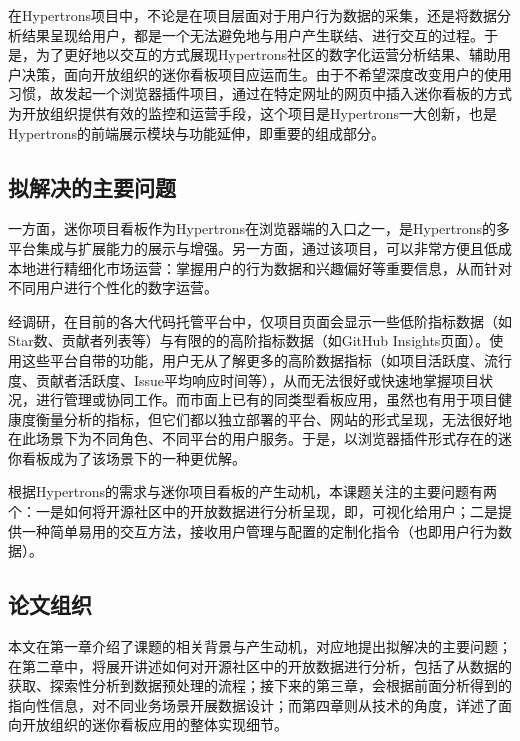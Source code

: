 \par 在Hypertrons项目中，不论是在项目层面对于用户行为数据的采集，还是将数据分析结果呈现给用户，都是一个无法避免地与用户产生联结、进行交互的过程。于是，为了更好地以交互的方式展现Hypertrons社区的数字化运营分析结果、辅助用户决策，面向开放组织的迷你看板项目应运而生。由于不希望深度改变用户的使用习惯，故发起一个浏览器插件项目，通过在特定网址的网页中插入迷你看板的方式为开放组织提供有效的监控和运营手段，这个项目是Hypertrons一大创新，也是Hypertrons的前端展示模块与功能延伸，即重要的组成部分。


\subsection{拟解决的主要问题}

\par 一方面，迷你项目看板作为Hypertrons在浏览器端的入口之一，是Hypertrons的多平台集成与扩展能力的展示与增强。另一方面，通过该项目，可以非常方便且低成本地进行精细化市场运营：掌握用户的行为数据和兴趣偏好等重要信息，从而针对不同用户进行个性化的数字运营。

\par 经调研，在目前的各大代码托管平台中，仅项目页面会显示一些低阶指标数据（如Star数、贡献者列表等）与有限的的高阶指标数据（如GitHub Insights页面）。使用这些平台自带的功能，用户无从了解更多的高阶数据指标（如项目活跃度、流行度、贡献者活跃度、Issue平均响应时间等），从而无法很好或快速地掌握项目状况，进行管理或协同工作。而市面上已有的同类型看板应用，虽然也有用于项目健康度衡量分析的指标，但它们都以独立部署的平台、网站的形式呈现，无法很好地在此场景下为不同角色、不同平台的用户服务。于是，以浏览器插件形式存在的迷你看板成为了该场景下的一种更优解。

\par 根据Hypertrons的需求与迷你项目看板的产生动机，本课题关注的主要问题有两个：一是如何将开源社区中的开放数据进行分析呈现，即，可视化给用户；二是提供一种简单易用的交互方法，接收用户管理与配置的定制化指令（也即用户行为数据）。

\subsection{论文组织}

\par 本文在第一章介绍了课题的相关背景与产生动机，对应地提出拟解决的主要问题；在第二章中，将展开讲述如何对开源社区中的开放数据进行分析，包括了从数据的获取、探索性分析到数据预处理的流程；接下来的第三章，会根据前面分析得到的指向性信息，对不同业务场景开展数据设计；而第四章则从技术的角度，详述了面向开放组织的迷你看板应用的整体实现细节。